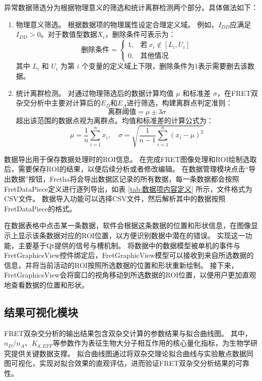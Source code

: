 异常数据筛选分为根据物理意义的筛选和统计离群检测两个部分。具体做法如下：
\begin{enumerate}
  \item 物理意义筛选。
  根据数据项的物理属性设定合理定义域。
  例如，$I_{DD}$应满足 $I_{DD} > 0$。对于数值型数据$X_i$，删除条件可表示为：
  \begin{equation}
    \text{删除条件} = 
      \begin{cases} 
        1, & \text{若} \ x_i \notin [L_i, U_i] \\
        0, & \text{其他情况}
      \end{cases}
  \end{equation}
  其中 $L_i$ 和 $U_i$ 为第 $i$ 个变量的定义域上下限，删除条件为1表示需要删去该数据。
  \item 统计离群检测。
  对通过物理筛选后的数据计算均值 $\mu$ 和标准差 $\sigma$，在FRET双杂交分析中主要对计算后的$E_D$和$E_A$进行筛选，构建离群点判定准则：
  \begin{equation}
      \text{离群阈值} = \mu \pm 3\sigma
  \end{equation}
  超出该范围的数据点视为离群点。均值和标准差的计算公式为：
  \begin{equation}
          \mu = \frac{1}{n}\sum_{i=1}^n x_i, \quad \sigma = \sqrt{\frac{1}{n-1}\sum_{i=1}^n (x_i - \mu)^2}
  \end{equation}
\end{enumerate}

数据导出用于保存数据处理时的ROI信息。
在完成FRET图像处理和ROI绘制选取后，需要保存ROI的结果，以便后续分析或者修改编辑。
在数据管理模块点击“导出数据”按钮，Fretha将会导出数据区记录的所有数据，每一条数据都会按照FretDataPiece定义进行逐列导出，如表 \ref{tab:数据项内容定义} 所示，文件格式为CSV文件。
数据导入功能可以选择CSV文件，然后解析其中的数据按照FretDataPiece的格式。

在数据表格中点击某一条数据，软件会根据这条数据的位置和形状信息，在图像显示上显示该条数据对应的ROI位置，以方便识别数据中潜在的错误。
实现这一功能，主要基于Qt提供的信号与槽机制。
将数据中的数据模型被单机的事件与FretGraphicsView控件绑定后，FretGraphicView模型可以接收到来自所选数据的信息，并将当前活动的ROI按照所选数据的位置和形状重新绘制。
接下来，FretGraphicsView会将窗口的视角移动到所选数据的ROI位置，以便用户更加直观地查看数据的位置和形状。

\subsection{结果可视化模块}
\ifshowtext
FRET双杂交分析的输出结果包含双杂交计算的参数结果与拟合曲线图。
其中，$n_D/n_A$、$K_{d,EFF}$等参数作为表征生物大分子相互作用的核心量化指标，为生物学研究提供关键数据支撑。
拟合曲线图通过将双杂交理论拟合曲线与实验散点数据同图可视化，实现对拟合效果的直观评估，进而验证FRET双杂交分析结果的可靠性。


